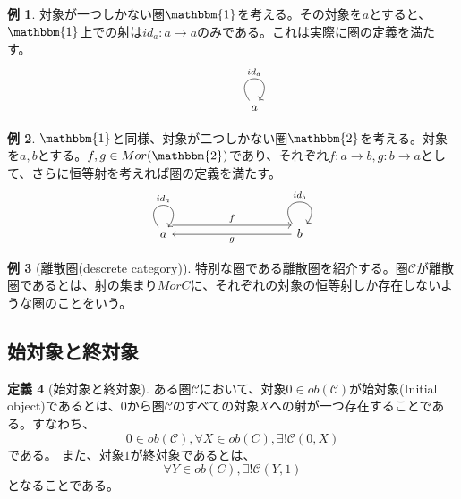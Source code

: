 \documentclass[unicode,12pt,report]{ltjsarticle}
\theoremstyle{definition}
\newtheorem{definition}{定義}[section]
\newtheorem{example}[definition]{例}
\begin{document}
\begin{example}
  対象が一つしかない圏$\mathbbm {1}$を考える。その対象を$a$とすると、$\mathbbm {1}$上での射は$id_a: a \to a$のみである。これは実際に圏の定義を満たす。
  \[\begin{tikzcd}
	&& a 
	\arrow["{id_a}", from=1-3, to=1-3, loop, in=55, out=125, distance=10mm]
\end{tikzcd}\]
\end{example}

\begin{example}
  $\mathbbm{1}$と同様、対象が二つしかない圏$\mathbbm{2}$を考える。対象を$a, b$とする。$f, g \in Mor(\mathbbm{2})$であり、それぞれ$f: a \to b, g:b \to a$として、さらに恒等射を考えれば圏の定義を満たす。
  \[\begin{tikzcd}
	a &&&& b
	\arrow["{id_a}", from=1-1, to=1-1, loop, in=55, out=125, distance=10mm]
	\arrow["f", shift left=3, from=1-1, to=1-5]
	\arrow["g", from=1-5, to=1-1]
	\arrow["{id_b}", from=1-5, to=1-5, loop, in=55, out=125, distance=10mm]
\end{tikzcd}\]
\end{example}

\begin{example}[離散圏(descrete category)]
  特別な圏である離散圏を紹介する。圏$\mathcal C$が離散圏であるとは、射の集まり$Mor C$に、それぞれの対象の恒等射しか存在しないような圏のことをいう。  
\end{example}

\subsection{始対象と終対象}
\begin{definition}[始対象と終対象]

  ある圏$\mathcal C$において、対象$0 \in ob(\mathcal C)$が始対象(Initial object)であるとは、$0$から$圏\mathcal C$のすべての対象$X$への射が一つ存在することである。すなわち、$$0 \in ob(\mathcal C), \forall X \in ob(C), \exists! \mathcal C (0, X)$$である。
  また、対象$1$が終対象であるとは、$$\forall Y \in ob(C), \exists!\mathcal C(Y, 1)$$となることである。
\end{definition}
\end{document}
